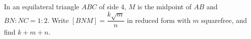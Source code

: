 In an equilateral triangle $ ABC $ of side 4, $ M $ is the midpoint of $ AB $ and $ BN:NC=1:2 $. Write $[BNM]=\dfrac{k\sqrt m}{n}$ in reduced form with $ m $ squarefree, and find $ k+m+n $.
